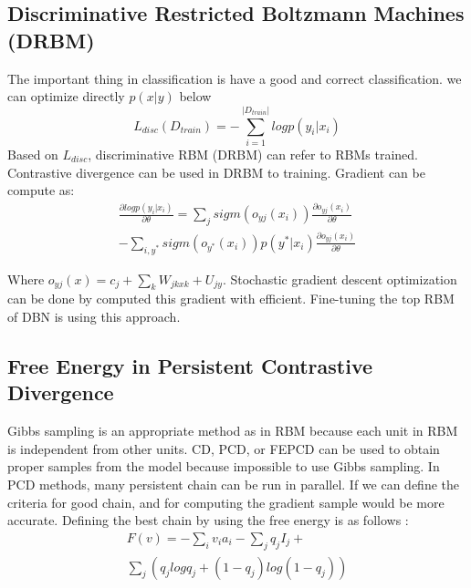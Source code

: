 \documentclass[conference]{IEEEtran}
\begin{document}
\subsection{Discriminative Restricted Boltzmann Machines (DRBM)}
The important thing in classification is have a good and
correct classification. we can optimize directly 
$ p\left ( x|y \right )$  below\cite{larochelle1}
\begin{equation}
L_{disc}\left ( D_{train} \right )= -\sum_{i=1}^{\left | D_{train} \right |}log    p\left ( y_{i}|x_{i} \right )
\end{equation}
Based on $L_{disc}$, discriminative RBM (DRBM) can refer to
RBMs trained. Contrastive divergence can be used in DRBM
to training\cite{taylor1}. Gradient can be compute as:
\begin{multline}
\frac{\partial log p\left ( y_{i}|x_{i} \right )}{\partial\theta } =\sum_{j}sigm\left ( o_{yj}\left ( x_{i} \right ) \right )\frac{\partial o_{yj}\left ( x_{i} \right )}{\partial\theta}
\\ -\sum_{i,y^{*}}sigm\left ( o_{y^{*}}\left ( x_{i} \right ) \right )p\left ( y^{*}|x_{i} \right )\frac{\partial o_{yj}\left ( x_{i} \right )}{\partial\theta}
\end{multline}

Where $o_{yj}\left ( x \right )=c_{j}+\sum_{k}W_{jkxk} + U_{jy}$. Stochastic gradient descent
optimization can be done by computed this gradient with
efficient. Fine-tuning the top RBM of DBN is using this
approach\cite{hinton1}.
\subsection{Free Energy in Persistent Contrastive Divergence}
Gibbs sampling is an appropriate method as in RBM
because each unit in RBM is independent from other units.
CD, PCD, or FEPCD\cite{keyvanrad2} can be used to obtain proper
samples from the model because impossible to use Gibbs
sampling.
In PCD methods, many persistent chain can be run in
parallel. If we can define the criteria for good chain, and for
computing the gradient sample would be more accurate.
Defining the best chain by using the free energy is as
follows \cite{hinton2} :
\begin{multline}
F\left ( v \right )=-\sum_{i}v_{i}a_{i}-\sum_{j}q_{j}I_{j}+
\\ \sum_{j}\left ( q_{j}log q_{j}+\left ( 1-q_{j} \right )log\left ( 1-q_{j} \right ) \right )
\end{multline}
\end{document}
